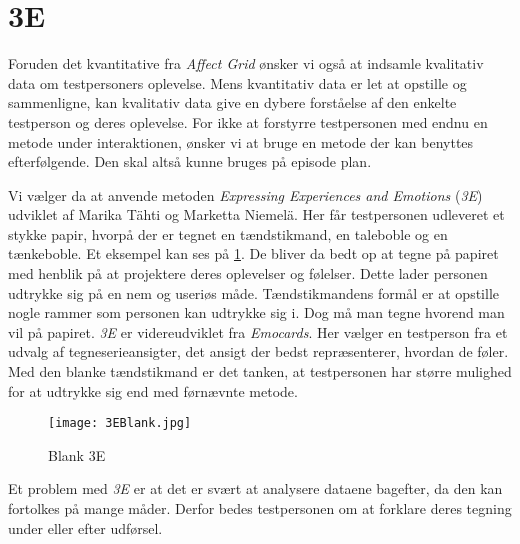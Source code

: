 \section{3E}\label{sec:3E}
Foruden det kvantitative fra \textit{Affect Grid} ønsker vi også at indsamle kvalitativ data om testpersoners oplevelse. Mens kvantitativ data er let at opstille og sammenligne, kan kvalitativ data give en dybere forståelse af den enkelte testperson og deres oplevelse. For ikke at forstyrre testpersonen med endnu en metode under interaktionen, ønsker vi at bruge en metode der kan benyttes efterfølgende. Den skal altså kunne bruges på episode plan.

Vi vælger da at anvende metoden \textit{Expressing Experiences and Emotions} (\textit{3E}) udviklet af Marika Tähti og Marketta Niemelä\cite{3E}. Her får testpersonen udleveret et stykke papir, hvorpå der er tegnet en tændstikmand, en taleboble og en tænkeboble. Et eksempel kan ses på \cref{fig:3E}. De bliver da bedt op at tegne på papiret med henblik på at projektere deres oplevelser og følelser. Dette lader personen udtrykke sig på en nem og useriøs måde. Tændstikmandens formål er at opstille nogle rammer som personen kan udtrykke sig i. Dog må man tegne hvorend man vil på papiret. \textit{3E} er videreudviklet fra \textit{Emocards}. Her vælger en testperson fra et udvalg af tegneserieansigter, det ansigt der bedst repræsenterer, hvordan de føler\cite{EmoCard}. Med den blanke tændstikmand er det tanken, at testpersonen har større mulighed for at udtrykke sig end med førnævnte metode. 

\begin{figure}[h]
\centering
\texttt{[image: 3EBlank.jpg]}
\caption{Blank 3E}
\label{fig:3E}
\end{figure}

Et problem med \textit{3E} er at det er svært at analysere dataene bagefter, da den kan fortolkes på mange måder. Derfor bedes testpersonen om at forklare deres tegning under eller efter udførsel.  